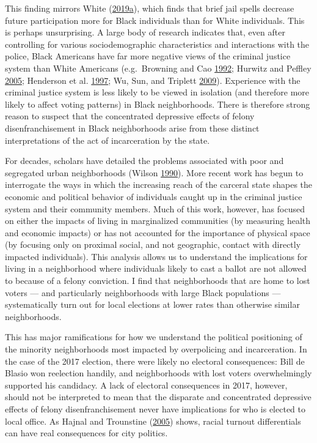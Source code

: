 \documentclass[12pt,]{article}
\begin{document}
This finding mirrors White (\protect\hyperlink{ref-White2019}{2019}\protect\hyperlink{ref-White2019}{a}), which finds that brief jail spells decrease future participation more for Black individuals than for White individuals. This is perhaps unsurprising. A large body of research indicates that, even after controlling for various sociodemographic characteristics and interactions with the police, Black Americans have far more negative views of the criminal justice system than White Americans (e.g.~Browning and Cao \protect\hyperlink{ref-Browning1992}{1992}; Hurwitz and Peffley \protect\hyperlink{ref-Hurwitz2005}{2005}; Henderson et al. \protect\hyperlink{ref-Henderson1997}{1997}; Wu, Sun, and Triplett \protect\hyperlink{ref-Wu2009}{2009}). Experience with the criminal justice system is less likely to be viewed in isolation (and therefore more likely to affect voting patterns) in Black neighborhoods. There is therefore strong reason to suspect that the concentrated depressive effects of felony disenfranchisement in Black neighborhoods arise from these distinct interpretations of the act of incarceration by the state.

For decades, scholars have detailed the problems associated with poor and segregated urban neighborhoods (Wilson \protect\hyperlink{ref-Wilson1990}{1990}). More recent work has begun to interrogate the ways in which the increasing reach of the carceral state shapes the economic and political behavior of individuals caught up in the criminal justice system and their community members. Much of this work, however, has focused on either the impacts of living in marginalized communities (by measuring health and economic impacts) or has not accounted for the importance of physical space (by focusing only on proximal social, and not geographic, contact with directly impacted individuals). This analysis allows us to understand the implications for living in a neighborhood where individuals likely to cast a ballot are not allowed to because of a felony conviction. I find that neighborhoods that are home to lost voters --- and particularly neighborhoods with large Black populations --- systematically turn out for local elections at lower rates than otherwise similar neighborhoods.

This has major ramifications for how we understand the political positioning of the minority neighborhoods most impacted by overpolicing and incarceration. In the case of the 2017 election, there were likely no electoral consequences: Bill de Blasio won reelection handily, and neighborhoods with lost voters overwhelmingly supported his candidacy. A lack of electoral consequences in 2017, however, should not be interpreted to mean that the disparate and concentrated depressive effects of felony disenfranchisement never have implications for who is elected to local office. As Hajnal and Trounstine (\protect\hyperlink{ref-Hajnal2005}{2005}) shows, racial turnout differentials can have real consequences for city politics.
\end{document}
